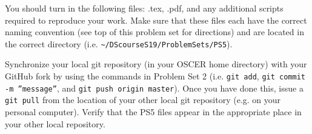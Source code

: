 \documentclass[12pt,english]{exam}
\begin{document}
\begin{questions}
\question You should turn in the following files: .tex, .pdf,  and any additional scripts required to reproduce your work.  Make sure that these files each have the correct naming convention (see top of this problem set for directions) and are located in the correct directory (i.e. \texttt{\textasciitilde/DScourseS19/ProblemSets/PS5}).

\question Synchronize your local git repository (in your OSCER home directory) with your GitHub fork by using the commands in Problem Set 2 (i.e. \texttt{git add}, \texttt{git commit -m ''message''}, and \texttt{git push origin master}). Once you have done this, issue a \texttt{git pull} from the location of your other local git repository (e.g. on your personal computer). Verify that the PS5 files appear in the appropriate place in your other local repository.

\end{questions}
\end{document}
